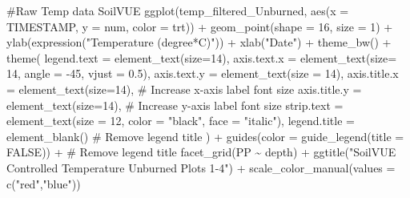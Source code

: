 \documentclass[
  letterpaper,
  DIV=11,
  numbers=noendperiod]{scrartcl}
\newenvironment{Shaded}{\begin{snugshade}}{\end{snugshade}}
\newcommand{\AttributeTok}[1]{\textcolor[rgb]{0.40,0.45,0.13}{#1}}
\newcommand{\CommentTok}[1]{\textcolor[rgb]{0.37,0.37,0.37}{#1}}
\newcommand{\ConstantTok}[1]{\textcolor[rgb]{0.56,0.35,0.01}{#1}}
\newcommand{\DecValTok}[1]{\textcolor[rgb]{0.68,0.00,0.00}{#1}}
\newcommand{\FloatTok}[1]{\textcolor[rgb]{0.68,0.00,0.00}{#1}}
\newcommand{\FunctionTok}[1]{\textcolor[rgb]{0.28,0.35,0.67}{#1}}
\newcommand{\NormalTok}[1]{\textcolor[rgb]{0.00,0.23,0.31}{#1}}
\newcommand{\SpecialCharTok}[1]{\textcolor[rgb]{0.37,0.37,0.37}{#1}}
\newcommand{\StringTok}[1]{\textcolor[rgb]{0.13,0.47,0.30}{#1}}
\begin{document}
\begin{Shaded}
\begin{Highlighting}[]
\CommentTok{\#Raw Temp data SoilVUE}
\FunctionTok{ggplot}\NormalTok{(temp\_filtered\_Unburned, }\FunctionTok{aes}\NormalTok{(}\AttributeTok{x =}\NormalTok{ TIMESTAMP, }\AttributeTok{y =}\NormalTok{ num, }\AttributeTok{color =}\NormalTok{ trt)) }\SpecialCharTok{+}
  \FunctionTok{geom\_point}\NormalTok{(}\AttributeTok{shape =} \DecValTok{16}\NormalTok{, }\AttributeTok{size =} \DecValTok{1}\NormalTok{) }\SpecialCharTok{+} 
  \FunctionTok{ylab}\NormalTok{(}\FunctionTok{expression}\NormalTok{(}\StringTok{"Temperature (degree*C)"}\NormalTok{)) }\SpecialCharTok{+}
  \FunctionTok{xlab}\NormalTok{(}\StringTok{"Date"}\NormalTok{) }\SpecialCharTok{+}
  \FunctionTok{theme\_bw}\NormalTok{() }\SpecialCharTok{+}
  \FunctionTok{theme}\NormalTok{(}
    \AttributeTok{legend.text =} \FunctionTok{element\_text}\NormalTok{(}\AttributeTok{size=}\DecValTok{14}\NormalTok{),}
    \AttributeTok{axis.text.x =} \FunctionTok{element\_text}\NormalTok{(}\AttributeTok{size=} \DecValTok{14}\NormalTok{, }\AttributeTok{angle =} \SpecialCharTok{{-}}\DecValTok{45}\NormalTok{, }\AttributeTok{vjust =} \FloatTok{0.5}\NormalTok{),}
    \AttributeTok{axis.text.y =} \FunctionTok{element\_text}\NormalTok{(}\AttributeTok{size =} \DecValTok{14}\NormalTok{),}
    \AttributeTok{axis.title.x =} \FunctionTok{element\_text}\NormalTok{(}\AttributeTok{size=}\DecValTok{14}\NormalTok{),  }\CommentTok{\# Increase x{-}axis label font size}
    \AttributeTok{axis.title.y =} \FunctionTok{element\_text}\NormalTok{(}\AttributeTok{size=}\DecValTok{14}\NormalTok{),  }\CommentTok{\# Increase y{-}axis label font size}
    \AttributeTok{strip.text =} \FunctionTok{element\_text}\NormalTok{(}\AttributeTok{size =} \DecValTok{12}\NormalTok{, }\AttributeTok{color =} \StringTok{"black"}\NormalTok{, }\AttributeTok{face =} \StringTok{"italic"}\NormalTok{),}
    \AttributeTok{legend.title =} \FunctionTok{element\_blank}\NormalTok{()  }\CommentTok{\# Remove legend title}
\NormalTok{  ) }\SpecialCharTok{+}
  \FunctionTok{guides}\NormalTok{(}\AttributeTok{color =} \FunctionTok{guide\_legend}\NormalTok{(}\AttributeTok{title =} \ConstantTok{FALSE}\NormalTok{)) }\SpecialCharTok{+}  \CommentTok{\# Remove legend title}
  \FunctionTok{facet\_grid}\NormalTok{(PP }\SpecialCharTok{\textasciitilde{}}\NormalTok{ depth) }\SpecialCharTok{+}
  \FunctionTok{ggtitle}\NormalTok{(}\StringTok{"SoilVUE Controlled Temperature Unburned Plots 1{-}4"}\NormalTok{) }\SpecialCharTok{+}
  \FunctionTok{scale\_color\_manual}\NormalTok{(}\AttributeTok{values =} \FunctionTok{c}\NormalTok{(}\StringTok{"red"}\NormalTok{,}\StringTok{"blue"}\NormalTok{))}
\end{Highlighting}
\end{Shaded}
\end{document}
